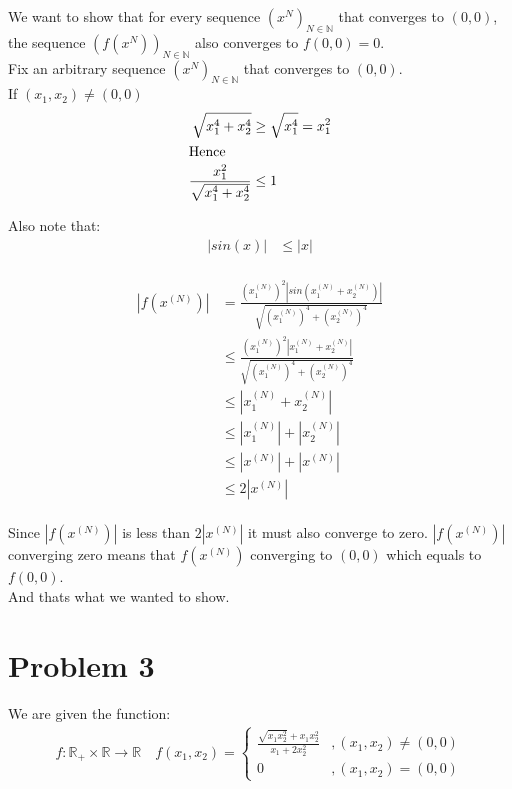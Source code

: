\documentclass{article}
\begin{document}
We want to show that for every sequence \((x^N)_{N \in \mathbb{N}}\) that converges to \((0,0)\),
the sequence \((f(x^N))_{N \in \mathbb{N}}\) also converges to \(f(0,0)=0\).\\

Fix an arbitrary sequence \((x^N)_{N \in \mathbb{N}}\) that converges to \((0,0)\). \\
If \((x_1, x_2) \neq (0, 0)\)
\begin{align*}
   \sqrt{x_1^4 + x_2^4} &\geq \sqrt{x_1^4} = x_1^2 \\
   \intertext{Hence}
   \frac{x_1^2}{\sqrt{x_1^4 + x_2^4}} &\leq 1 \\
\end{align*}

Also note that:
\begin{align*}
   |sin(x)| &\leq |x| \\
\end{align*}

\begin{align*}
   |f(x^{(N)})| &= \frac{(x_1^{(N)})^2 |sin(x_1^{(N)}+x_2^{(N)})|}{\sqrt{(x_1^{(N)})^4 + (x_2^{(N)})^4}} \\
   &\leq \frac{(x_1^{(N)})^2 |x_1^{(N)}+x_2^{(N)}|}{\sqrt{(x_1^{(N)})^4 + (x_2^{(N)})^4}} \\
   &\leq |x_1^{(N)} + x_2^{(N)}| \\
   &\leq |x_1^{(N)}| + |x_2^{(N)}| \\
   &\leq |x^{(N)}| + |x^{(N)}| \\
   &\leq 2|x^{(N)}| \\
\end{align*}

Since \(|f(x^{(N)})|\) is less than \(2|x^{(N)}|\) it must also converge to zero. \(|f(x^{(N)})|\) converging zero means that
\(f(x^{(N)})\) converging to \((0, 0)\) which equals to \(f(0,0)\). \\
And thats what we wanted to show.

\section*{Problem 3}
We are given the function:
\begin{align*}
   f: \mathbb{R}_+ \times \mathbb{R}  \to \mathbb{R} \quad f(x_1,x_2) = \begin{cases}
      \frac{\sqrt{x_1 x_2^2} + x_1 x_2^2}{x_1 + 2x_2^2} &, (x_1,x_2) \neq (0,0) \\
      0 &, (x_1,x_2) = (0,0)
   \end{cases}
\end{align*}
\end{document}
